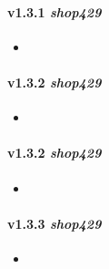 \paragraph{v1.3.1 \textit{shop429}}
  \begin{itemize}
  	\item
  \end{itemize}
\paragraph{v1.3.2 \textit{shop429}}
  \begin{itemize}
  	\item
  \end{itemize}
\paragraph{v1.3.2 \textit{shop429}}
  \begin{itemize}
  	\item
  \end{itemize}
\paragraph{v1.3.3 \textit{shop429}}
  \begin{itemize}
  	\item
  \end{itemize}
